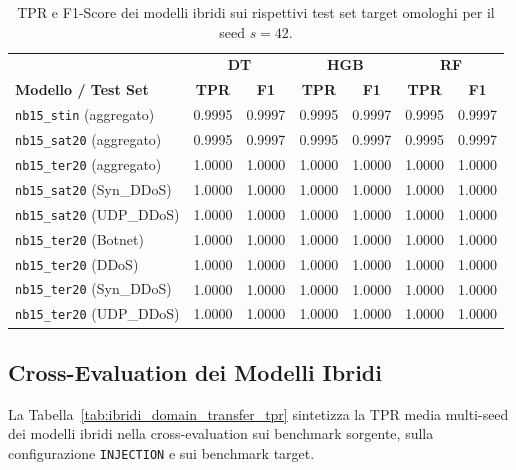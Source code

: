 \begin{table}[H]
    \centering
    \footnotesize
    \caption{TPR e F1-Score dei modelli ibridi sui rispettivi test set target omologhi per il seed $s=42$.}
    \label{tab:ibridi_matched_seed42}
    \begin{tabular}{lcccccc}
        \toprule
        & \multicolumn{2}{c}{\textbf{DT}} & \multicolumn{2}{c}{\textbf{HGB}} & \multicolumn{2}{c}{\textbf{RF}} \\
        \textbf{Modello / Test Set} & \textbf{TPR} & \textbf{F1} & \textbf{TPR} & \textbf{F1} & \textbf{TPR} & \textbf{F1} \\
        \midrule
        \texttt{nb15\_stin} (aggregato) & 0.9995 & 0.9997 & 0.9995 & 0.9997 & 0.9995 & 0.9997 \\
        \texttt{nb15\_sat20} (aggregato) & 0.9995 & 0.9997 & 0.9995 & 0.9997 & 0.9995 & 0.9997 \\
        \texttt{nb15\_ter20} (aggregato) & 1.0000 & 1.0000 & 1.0000 & 1.0000 & 1.0000 & 1.0000 \\
        \texttt{nb15\_sat20} (Syn\_DDoS) & 1.0000 & 1.0000 & 1.0000 & 1.0000 & 1.0000 & 1.0000 \\
        \texttt{nb15\_sat20} (UDP\_DDoS) & 1.0000 & 1.0000 & 1.0000 & 1.0000 & 1.0000 & 1.0000 \\
        \texttt{nb15\_ter20} (Botnet) & 1.0000 & 1.0000 & 1.0000 & 1.0000 & 1.0000 & 1.0000 \\
        \texttt{nb15\_ter20} (DDoS) & 1.0000 & 1.0000 & 1.0000 & 1.0000 & 1.0000 & 1.0000 \\
        \texttt{nb15\_ter20} (Syn\_DDoS) & 1.0000 & 1.0000 & 1.0000 & 1.0000 & 1.0000 & 1.0000 \\
        \texttt{nb15\_ter20} (UDP\_DDoS) & 1.0000 & 1.0000 & 1.0000 & 1.0000 & 1.0000 & 1.0000 \\
        \bottomrule
    \end{tabular}
\end{table}



\subsection{Cross-Evaluation dei Modelli Ibridi}

La Tabella~\ref{tab:ibridi_domain_transfer_tpr} sintetizza la TPR media multi-seed dei modelli ibridi nella cross-evaluation sui benchmark sorgente, sulla configurazione \texttt{INJECTION} e sui benchmark target.


